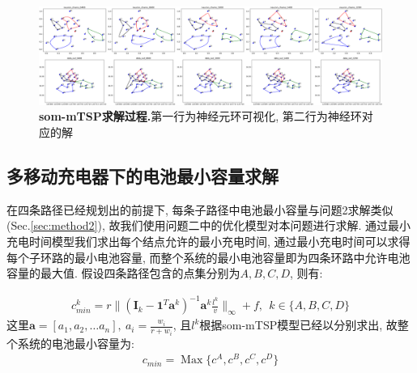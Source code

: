 \begin{figure}[h]
    \begin{center}
        \includegraphics[width=1.0\linewidth]{fig/iteration2}
    \end{center}
    \caption{\textbf{som-mTSP求解过程.}第一行为神经元环可视化, 第二行为神经环对应的解} 
        \label{fig:iteration}
  \end{figure}

\subsection{多移动充电器下的电池最小容量求解}

在四条路径已经规划出的前提下, 每条子路径中电池最小容量与问题2求解类似(Sec.\ref{sec:method2}), 故我们使用问题二中的优化模型对本问题进行求解. 通过最小充电时间模型我们求出每个结点允许的最小充电时间, 通过最小充电时间可以求得每个子环路的最小电池容量, 而整个系统的最小电池容量即为四条环路中允许电池容量的最大值.
假设四条路径包含的点集分别为$A,B,C,D$, 则有:


\begin{eqnarray}
    c^k_{min} =r \| (\textbf{I}_k- \textbf{1}^T\textbf{a}^k )^{-1}\textbf{a}^k \frac{l^k}{v}\|_{\infty} +f ,~~k \in \{A,B,C,D\}
\end{eqnarray}
这里$\textbf{a} = [a_1, a_2, \dots a_n],~ a_i = \frac{w_i}{r+w_i}$, 且$l^k$根据som-mTSP模型已经以分别求出, 故整个系统的电池最小容量为:
\begin{eqnarray}
    c_{min} = \mathop{Max}\{c^A,c^B, c^C,c^D\}
\end{eqnarray}
